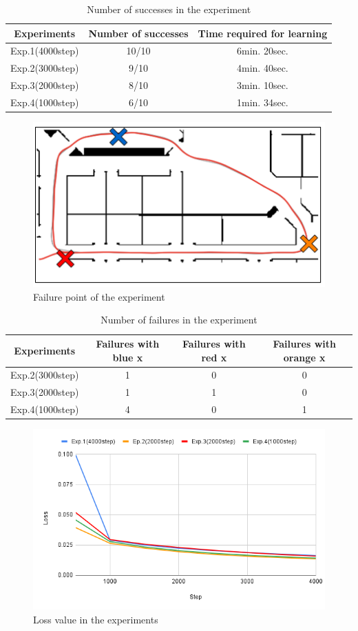 \begin{table}[h]
  \centering
  \begin{tabular}{|c|c|c|} \hline
    Experiments & Number of successes & Time required for learning\\ \hline
    Exp.1(4000step) & 10/10 & 6min. 20sec.\\ \hline
    Exp.2(3000step) & 9/10 & 4min. 40sec.\\ \hline
    Exp.3(2000step) & 8/10 & 3min. 10sec.\\ \hline
    Exp.4(1000step) & 6/10 & 1min. 34sec.\\ \hline
  \end{tabular}
  \caption{Number of successes in the experiment}
  \label{tb:exp3}
\end{table}

\begin{figure}[h]
  \centering
  \includegraphics[keepaspectratio, scale=0.5]{images/result4.png}
  \caption{Failure point of the experiment}
  \label{Fig:result3}
  \end{figure}

\begin{table}[h]
  \centering
  \begin{tabular}{|c|c|c|c|} \hline
    Experiments & Failures with blue x & Failures with red x & Failures with orange x\\ \hline
    Exp.2(3000step) & 1 & 0 & 0\\ \hline
    Exp.3(2000step) & 1 & 1 & 0\\ \hline
    Exp.4(1000step) & 4 & 0 & 1\\ \hline
  \end{tabular}
  \caption{Number of failures in the experiment}
  \label{tb:fail3}
\end{table}

\begin{figure}[h]
  \centering
  \includegraphics[keepaspectratio, scale=0.5]{images/loss3.png}
  \caption{Loss value in the experiments}
  \label{Fig:loss3}
  \end{figure}